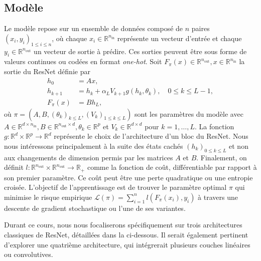\subsection*{Modèle}
Le modèle repose sur un ensemble de données composé de $n$ paires $(x_i, y_i)_{1 \leqslant i \leqslant n}$, où chaque $x_i \in \mathbb{R}^{n_{\text{in}}}$ représente un vecteur d'entrée et chaque $y_i \in \mathbb{R}^{n_{\text{out}}}$ un vecteur de sortie à prédire. Ces sorties peuvent être sous forme de valeurs continues ou codées en format \textit{one-hot}. Soit $F_\pi(x) \in \mathbb{R}^{n_{\text{out}}}, x \in \mathbb{R}^{n_{\text{in}}}$ la sortie du ResNet définie par 
\begin{align}\label{ResNet_equation}
    h_0 &= Ax, \nonumber\\
    h_{k+1} &= h_k + \alpha_L V_{k+1}g(h_k, \theta_k), \quad 0 \leqslant k \leqslant L - 1, \\
    F_{\pi}(x) &= Bh_L, \nonumber
\end{align}
où $\pi = (A, B, (\theta_k)_{k \leqslant L}, (V_k)_{1 \leqslant k \leqslant L})$ sont les paramètres du modèle avec $A \in \mathbb{R}^{d \times n_{\text{in}}}, B \in \mathbb{R}^{n_{\text{out}} \times d}, \theta_k \in \mathbb{R}^p$ et $V_k \in \mathbb{R}^{d \times d}$ pour $k = 1, \ldots, L$. La fonction $g : \mathbb{R}^d \times \mathbb{R}^p \to \mathbb{R}^d$ représente le choix de l'architecture d'un bloc du ResNet. Nous nous intéressons principalement à la suite des états cachés $(h_k)_{0 \leqslant k \leqslant L}$ et non aux changements de dimension permis par les matrices $A$ et $B$.
Finalement, on définit $l: \mathbb{R}^{n_{\text{out}}} \times \mathbb{R}^{n_{\text{out}}} \to \mathbb{R}_+$ comme la fonction de coût, différentiable par rapport à son premier paramètre. Ce coût peut être une perte quadratique ou une entropie croisée. L'objectif de l'apprentissage est de trouver le paramètre optimal $\pi$ qui minimise le risque empirique $\mathscr{L}(\pi) = \sum_{i=1}^{n} l(F_\pi(x_i), y_i)$ à travers une descente de gradient stochastique ou l'une de ses variantes.

Durant ce cours, nous nous focaliserons spécifiquement sur trois architectures classiques de ResNet, détaillées dans la  ci-dessous. Il serait également pertinent d'explorer une quatrième architecture, qui intégrerait plusieurs couches linéaires ou convolutives.


